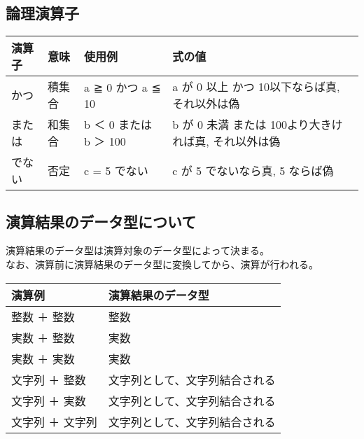 \documentclass[11pt,a4j]{jarticle}
\begin{document}
\subsection{論理演算子}
\begin{table}[htbp]
  \begin{center}
    \begin{tabular}{l|l|l|p{6.0cm}} \hline
    演算子	& 意味		& 使用例					& 式の値	\\ \hline
    かつ	& 積集合	& a ≧ 0 かつ a ≦ 10		& a が 0 以上 かつ 10以下ならば真, それ以外は偽			\\ \hline
    または	& 和集合	& b ＜ 0 または b ＞ 100	& b が 0 未満 または 100より大きければ真, それ以外は偽	\\ \hline
    でない	& 否定		& c = 5 でない				& c が 5 でないなら真, 5 ならば偽					\\ \hline
    \end{tabular}
  \end{center}
  \vspace{-1.0cm}
\end{table}


\subsection{演算結果のデータ型について}
演算結果のデータ型は演算対象のデータ型によって決まる。 \\
なお、演算前に演算結果のデータ型に変換してから、演算が行われる。

\begin{table}[!h]
  \begin{center}
    \begin{tabular}{l|l} \hline
    演算例				& 演算結果のデータ型				\\ \hline
    整数 ＋ 整数		& 整数								\\ \hline
    実数 ＋ 整数		& 実数								\\ \hline
    実数 ＋ 実数		& 実数								\\ \hline
    文字列 ＋ 整数		& 文字列として、文字列結合される	\\ \hline
    文字列 ＋ 実数		& 文字列として、文字列結合される	\\ \hline
    文字列 ＋ 文字列	& 文字列として、文字列結合される	\\ \hline
    \end{tabular}
  \end{center}
  \vspace{-1.0cm}
\end{table}
\end{document}
